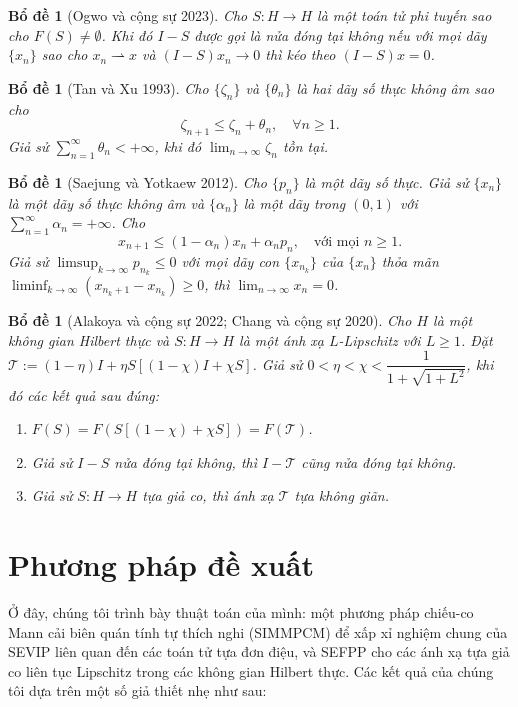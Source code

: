 \documentclass{MyBook}
\theoremstyle{plain}
\newtheorem{lemma}[theorem]{Bổ đề}
\theoremstyle{definition}
\theoremstyle{remark}
\numberwithin{equation}{chapter}
\newcommand{\wto}{\rightharpoonup}
\newcommand{\Fix}[1]{F(#1)}
\begin{document}
\begin{lemma}[Ogwo và cộng sự 2023]\label{lem:2.8}
Cho $S:H\to H$ là một toán tử phi tuyến sao cho $\Fix{S}\ne\emptyset$. Khi đó $I-S$ được gọi là \textit{nửa đóng tại không} nếu với mọi dãy $\{x_n\}$ sao cho $x_n\wto x$ và $(I-S)x_n\to 0$ thì kéo theo $(I-S)x=0$.
\end{lemma}

\begin{lemma}[Tan và Xu 1993]\label{lem:2.9}
Cho $\{\zeta_n\}$ và $\{\theta_n\}$ là hai dãy số thực không âm sao cho
\[
\zeta_{n+1}\le\zeta_n+\theta_n,\quad\forall n\ge 1.
\]
Giả sử $\sum_{n=1}^{\infty}\theta_n<+\infty$, khi đó $\lim_{n\to\infty}\zeta_n$ tồn tại.
\end{lemma}

\begin{lemma}[Saejung và Yotkaew 2012]\label{lem:2.10}
Cho $\{p_n\}$ là một dãy số thực. Giả sử $\{x_n\}$ là một dãy số thực không âm và $\{\alpha_n\}$ là một dãy trong $(0,1)$ với $\sum_{n=1}^{\infty}\alpha_n=+\infty$. Cho
\[
x_{n+1}\le(1-\alpha_n)x_n+\alpha_n p_n,\quad\text{với mọi } n\ge 1.
\]
Giả sử $\limsup_{k\to\infty}p_{n_k}\le 0$ với mọi dãy con $\{x_{n_k}\}$ của $\{x_n\}$ thỏa mãn $\liminf_{k\to\infty}(x_{n_k+1}-x_{n_k})\ge 0$, thì $\lim_{n\to\infty}x_n=0$.
\end{lemma}

\begin{lemma}[Alakoya và cộng sự 2022; Chang và cộng sự 2020]\label{lem:2.11}
Cho $H$ là một không gian Hilbert thực và $S:H\to H$ là một ánh xạ $L$-Lipschitz với $L\ge 1$. Đặt $\mathcal{T}:=(1-\eta)I+\eta S[(1-\chi)I+\chi S]$. Giả sử $0<\eta<\chi<\dfrac{1}{1+\sqrt{1+L^2}}$, khi đó các kết quả sau đúng:
\begin{enumerate}[label=(\roman*)]
\item $\Fix{S}=F(S[(1-\chi)+\chi S])=F(\mathcal{T})$.
\item Giả sử $I-S$ nửa đóng tại không, thì $I-\mathcal{T}$ cũng nửa đóng tại không.
\item Giả sử $S:H\to H$ tựa giả co, thì ánh xạ $\mathcal{T}$ tựa không giãn.
\end{enumerate}
\end{lemma}

\chapter{Phương pháp đề xuất}\label{sec:method}

Ở đây, chúng tôi trình bày thuật toán của mình: một phương pháp chiếu-co Mann cải biên quán tính tự thích nghi (SIMMPCM) để xấp xỉ nghiệm chung của SEVIP liên quan đến các toán tử tựa đơn điệu, và SEFPP cho các ánh xạ tựa giả co liên tục Lipschitz trong các không gian Hilbert thực. Các kết quả của chúng tôi dựa trên một số giả thiết nhẹ như sau:
\end{document}
